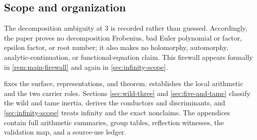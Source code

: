 \subsection{Scope and organization}

The decomposition ambiguity at $3$ is recorded rather than guessed.
Accordingly, the paper proves no decomposition Frobenius, bad Euler
polynomial or factor, epsilon factor, or root number; it also makes no
holomorphy, automorphy, analytic-continuation, or functional-equation claim.
This firewall appears formally in \cref{rem:main-firewall} and again in
\cref{sec:infinity-scope}.

 fixes the surface, representations, and theorem.
 establishes the local arithmetic and the two
carrier roles.  Sections \ref{sec:wild-three} and
\ref{sec:five-and-tame} classify the wild and tame inertia.
 derives the conductors and discriminants, and
\cref{sec:infinity-scope} treats infinity and the exact nonclaims.  The
appendices contain full arithmetic summaries, group tables, reflection
witnesses, the validation map, and a source-use ledger.
